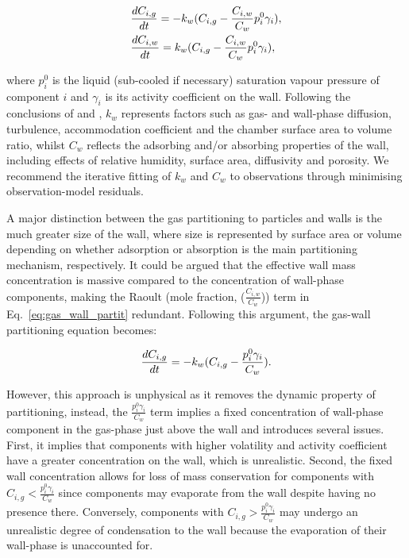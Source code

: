 \documentclass[gmd, manuscript]{copernicus}
\begin{document}
\begin{align} \label{eq:gas_wall_partit}
	&\frac{dC_{i,g}}{dt} = -k_{w}(C_{i,g}-\frac{C_{i,w}}{C_{w}}p^{0}_{i}\gamma_{i})\rm{,}\\
	&\frac{dC_{i,w}}{dt} = k_{w}(C_{i,g}-\frac{C_{i,w}}{C_{w}}p^{0}_{i}\gamma_{i})\rm{,}
\end{align}

where $p^{0}_{i}$ is the liquid (sub-cooled if necessary) saturation vapour pressure of component $i$ and $\gamma_{i}$ is its activity coefficient on the wall.  Following the conclusions of \citet{Matsunaga2010} and \citet{Zhang2015b}, $k_{w}$ represents factors such as gas- and wall-phase diffusion, turbulence, accommodation coefficient and the chamber surface area to volume ratio, whilst $C_{w}$ reflects the adsorbing and/or absorbing properties of the wall, including effects of relative humidity, surface area, diffusivity and porosity.  We recommend the iterative fitting of $k_{w}$ and $C_{w}$ to observations through minimising observation-model residuals.

A major distinction between the gas partitioning to particles and walls is the much greater size of the wall, where size is represented by surface area or volume depending on whether adsorption or absorption is the main partitioning mechanism, respectively.  It could be argued that the effective wall mass concentration is massive compared to the concentration of wall-phase components, making the Raoult (mole fraction, ($\frac{C_{i,w}}{C_{w}}$)) term in Eq.~\ref{eq:gas_wall_partit} redundant.  Following this argument, the gas-wall partitioning equation becomes:

\begin{equation} \label{eq:gas_wall_partit2}
\frac{dC_{i,g}}{dt} = -k_{w}(C_{i,g}-\frac{p^{0}_{i}\gamma_{i}}{C_{w}})\rm{.}
\end{equation}

However, this approach is unphysical as it removes the dynamic property of partitioning, instead, the $\frac{p^{0}_{i}\gamma_{i}}{C_{w}}$ term implies a fixed concentration of wall-phase component in the gas-phase just above the wall and introduces several issues.  First, it implies that components with higher volatility and activity coefficient have a greater concentration on the wall, which is unrealistic.  Second, the fixed wall concentration allows for loss of mass conservation for components with $C_{i,g}<\frac{p^{0}_{i}\gamma_{i}}{C_{w}}$ since components may evaporate from the wall despite having no presence there.  Conversely, components with  $C_{i,g}>\frac{p^{0}_{i}\gamma_{i}}{C_{w}}$ may undergo an unrealistic degree of condensation to the wall because the evaporation of their wall-phase is unaccounted for.
\end{document}

